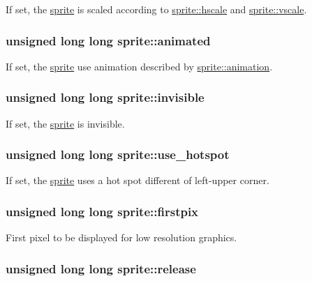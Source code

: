 If set, the \hyperlink{structsprite}{sprite} is scaled according to \hyperlink{structsprite_85b8ccf657c3b74535a497b57adf47c2}{sprite::hscale} and \hyperlink{structsprite_a5b542ecac2fc466bcc651cd5053096e}{sprite::vscale}. \hypertarget{structsprite_daf6656b292f5f6236c8dd3ea4457735}{
\subsubsection{\setlength{\rightskip}{0pt plus 5cm}unsigned long long {\bf sprite::animated}}}
\label{structsprite_daf6656b292f5f6236c8dd3ea4457735}


If set, the \hyperlink{structsprite}{sprite} use animation described by \hyperlink{structsprite_988af45ecb82acc80fc1e3394abc2b9b}{sprite::animation}. \hypertarget{structsprite_c96a2ecd91402d23902a510da5d0227f}{
\subsubsection{\setlength{\rightskip}{0pt plus 5cm}unsigned long long {\bf sprite::invisible}}}
\label{structsprite_c96a2ecd91402d23902a510da5d0227f}


If set, the \hyperlink{structsprite}{sprite} is invisible. \hypertarget{structsprite_abf5eff390d7222c61b15811512088d9}{
\subsubsection{\setlength{\rightskip}{0pt plus 5cm}unsigned long long {\bf sprite::use\_\-hotspot}}}
\label{structsprite_abf5eff390d7222c61b15811512088d9}


If set, the \hyperlink{structsprite}{sprite} uses a hot spot different of left-upper corner. \hypertarget{structsprite_b546d57d6618244b7d1b120ffe564ab5}{
\subsubsection{\setlength{\rightskip}{0pt plus 5cm}unsigned long long {\bf sprite::firstpix}}}
\label{structsprite_b546d57d6618244b7d1b120ffe564ab5}


First pixel to be displayed for low resolution graphics. \hypertarget{structsprite_88d4cd0b2d0bfa828d0801a964a53afc}{
\subsubsection{\setlength{\rightskip}{0pt plus 5cm}unsigned long long {\bf sprite::release}}}
\label{structsprite_88d4cd0b2d0bfa828d0801a964a53afc}


